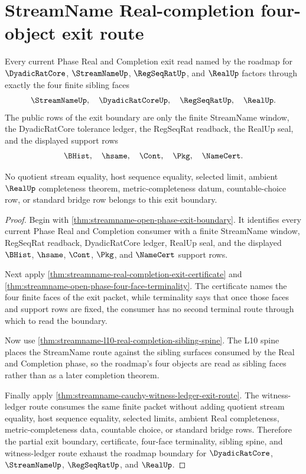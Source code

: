 \section{StreamName Real-completion four-object exit route}
\label{sec:streamname-real-completion-four-object-exit-route}

\begin{theorem}
\label{thm:streamname-real-completion-four-object-exit-route}
Every current Phase Real and Completion exit read named by the roadmap for $\DyadicRatCore$, $\StreamNameUp$, $\RegSeqRatUp$, and $\RealUp$ factors through exactly the four finite sibling faces
$$
\StreamNameUp,\quad \DyadicRatCoreUp,\quad \RegSeqRatUp,\quad \RealUp.
$$
The public rows of the exit boundary are only the finite StreamName window, the DyadicRatCore tolerance ledger, the RegSeqRat readback, the RealUp seal, and the displayed support rows
$$
\BHist,\quad \hsame,\quad \Cont,\quad \Pkg,\quad \NameCert.
$$

No quotient stream equality, host sequence equality, selected limit, ambient $\RealUp$ completeness theorem, metric-completeness datum, countable-choice row, or standard bridge row belongs to this exit boundary.
\end{theorem}
\begin{proof}
Begin with \autoref{thm:streamname-open-phase-exit-boundary}. It identifies every current Phase Real and Completion consumer with a finite StreamName window, RegSeqRat readback, DyadicRatCore ledger, RealUp seal, and the displayed $\BHist$, $\hsame$, $\Cont$, $\Pkg$, and $\NameCert$ support rows.

Next apply \autoref{thm:streamname-real-completion-exit-certificate} and \autoref{thm:streamname-open-phase-four-face-terminality}. The certificate names the four finite faces of the exit packet, while terminality says that once those faces and support rows are fixed, the consumer has no second terminal route through which to read the boundary.

Now use \autoref{thm:streamname-l10-real-completion-sibling-spine}. The L10 spine places the StreamName route against the sibling surfaces consumed by the Real and Completion phase, so the roadmap's four objects are read as sibling faces rather than as a later completion theorem.

Finally apply \autoref{thm:streamname-cauchy-witness-ledger-exit-route}. The witness-ledger route consumes the same finite packet without adding quotient stream equality, host sequence equality, selected limits, ambient Real completeness, metric-completeness data, countable choice, or standard bridge rows. Therefore the partial exit boundary, certificate, four-face terminality, sibling spine, and witness-ledger route exhaust the roadmap boundary for $\DyadicRatCore$, $\StreamNameUp$, $\RegSeqRatUp$, and $\RealUp$.
\end{proof}

